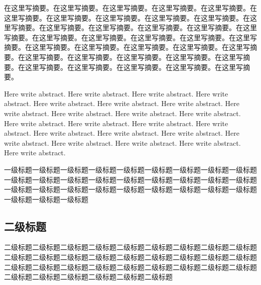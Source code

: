 \documentclass[12pt, a4paper]{article}
\begin{document}
\reAbstract %

在这里写摘要。在这里写摘要。在这里写摘要。在这里写摘要。在这里写摘要。在这里写摘要。在这里写摘要。在这里写摘要。在这里写摘要。在这里写摘要。在这里写摘要。在这里写摘要。在这里写摘要。在这里写摘要。在这里写摘要。在这里写摘要。在这里写摘要。在这里写摘要。在这里写摘要。在这里写摘要。在这里写摘要。在这里写摘要。在这里写摘要。在这里写摘要。在这里写摘要。在这里写摘要。在这里写摘要。在这里写摘要。在这里写摘要。在这里写摘要。在这里写摘要。在这里写摘要。在这里写摘要。在这里写摘要。在这里写摘要。在这里写摘要。


\reAbstractEN

Here write abstract. Here write abstract. Here write abstract. Here write abstract. Here write abstract. Here write abstract. Here write abstract. Here write abstract. Here write abstract. Here write abstract. Here write abstract. Here write abstract. Here write abstract. Here write abstract. Here write abstract. Here write abstract. Here write abstract. Here write abstract. Here write abstract. Here write abstract. Here write abstract. Here write abstract. Here write abstract. 


\begin{center}
    \tableofcontents
\end{center}



一级标题一级标题一级标题一级标题一级标题一级标题一级标题一级标题一级标题一级标题一级标题一级标题一级标题一级标题一级标题一级标题一级标题一级标题一级标题一级标题一级标题一级标题一级标题一级标题一级标题一级标题一级标题一级标题一级标题一级标题

\subsection{二级标题}
二级标题二级标题二级标题二级标题二级标题二级标题二级标题二级标题二级标题二级标题二级标题二级标题二级标题二级标题二级标题二级标题二级标题二级标题二级标题二级标题二级标题二级标题二级标题二级标题二级标题二级标题二级标题二级标题二级标题二级标题二级标题二级标题二级标题
\end{document}

